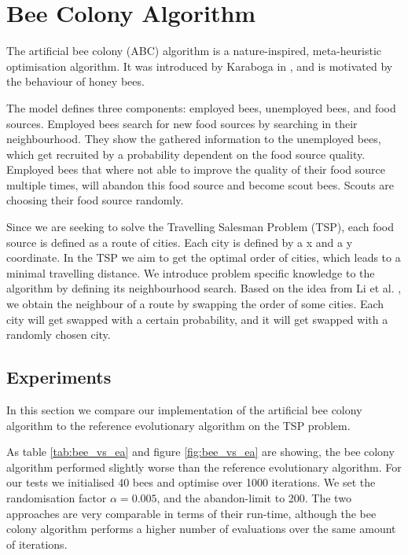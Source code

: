 \section{Bee Colony Algorithm}

The artificial bee colony (ABC) algorithm is a nature-inspired, meta-heuristic optimisation
algorithm. It was introduced by Karaboga in \cite{beecolony}, and is motivated by the behaviour of honey bees.

The model defines three components: employed bees, unemployed bees, and food sources. Employed bees search for new food sources by searching in their neighbourhood. They show the gathered information to the unemployed bees, which get recruited by a probability dependent on the food source quality. Employed bees that where not able to improve the quality of their food source multiple times, will abandon this food source and become scout bees. Scouts are choosing their food source randomly.

Since we are seeking to solve the Travelling Salesman Problem (TSP), each food source is defined as a route of cities. Each city is defined by a x and a y coordinate. In the TSP we aim to get the optimal order of cities, which leads to a minimal travelling distance. We introduce problem specific knowledge to the algorithm by defining its neighbourhood search. Based on the idea from Li et al. \cite{beetsp}, we obtain the neighbour of a route by swapping the order of some cities. Each city will get swapped with a certain probability, and it will get swapped with a randomly chosen city.


\subsection{Experiments}

In this section we compare our implementation of the artificial bee colony algorithm to the
reference evolutionary algorithm on the TSP problem.

As table \ref{tab:bee_vs_ea} and figure \ref{fig:bee_vs_ea} are showing, the bee colony algorithm performed slightly worse than the reference evolutionary algorithm. For our tests we initialised 40 bees and optimise over 1000 iterations. We set the randomisation factor $\alpha = 0.005$, and the abandon-limit to 200.
The two approaches are very comparable in terms of their run-time, although the bee colony algorithm performs a higher number of evaluations over the same amount of iterations.

